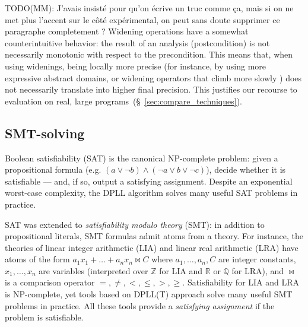 \documentclass{llncs}
\newcommand{\ZZ}{\mathbb{Z}}
\newcommand{\QQ}{\mathbb{Q}}
\newcommand{\RR}{\mathbb{R}}
\newcommand{\avirer}[1]{{\color{red} #1}}
\newcommand{\MM}[1]{{\color{blue} TODO(MM): #1}}
\newcommand{\avirer}[1]{}
\newcommand{\MM}[1]{}
\begin{document}
\MM{J'avais insisté pour qu'on écrive un truc comme ça, mais si on ne
  met plus l'accent sur le côté expérimental, on peut sans doute
  supprimer ce paragraphe completement ?}
\avirer{
Widening operations have a somewhat counterintuitive behavior: the
result of an analysis (postcondition) is not necessarily monotonic
with respect to the precondition.
This means that, when using widenings, being locally more precise \avirer{(for instance, by using more expressive abstract domains, or widening operators that climb more slowly \cite{BagnaraHRZ05SCP})} does not necessarily translate into higher final precision.
This justifies our recourse to evaluation on real, large programs~(\S~\ref{sec:compare_techniques}).
}

\subsection{SMT-solving}
Boolean satisfiability (SAT) is the canonical NP-complete problem: given a propositional formula (e.g. $(a \lor \neg b) \land (\neg a \lor b \lor \neg c)$), decide whether it is satisfiable --- and, if so, output a satisfying assignment.
Despite an exponential worst-case complexity, the DPLL algorithm \cite{Kroening_Strichman_08,Handbook_SAT} solves many useful SAT problems in practice.

SAT was extended to \emph{satisfiability modulo theory} (SMT): in addition to propositional literals, SMT formulas admit atoms from a theory.
For instance, the theories of linear integer arithmetic (LIA) and linear real arithmetic (LRA) have atoms of the form $a_1 x_1 + \dots + a_n x_n \bowtie C$ where $a_1,\dots,a_n,C$ are integer constants, $x_1,\dots,x_n$ are variables (interpreted over $\ZZ$ for LIA and $\RR$ or $\QQ$ for LRA), and $\bowtie$ is a comparison operator $=,\neq,<,\leq,>,\geq$.
Satisfiability for LIA and LRA is NP-complete, yet tools based on DPLL(T) approach \cite{Kroening_Strichman_08,Handbook_SAT} solve many useful SMT problems in practice. All these tools provide a \emph{satisfying assignment} if the problem is satisfiable.
\end{document}
